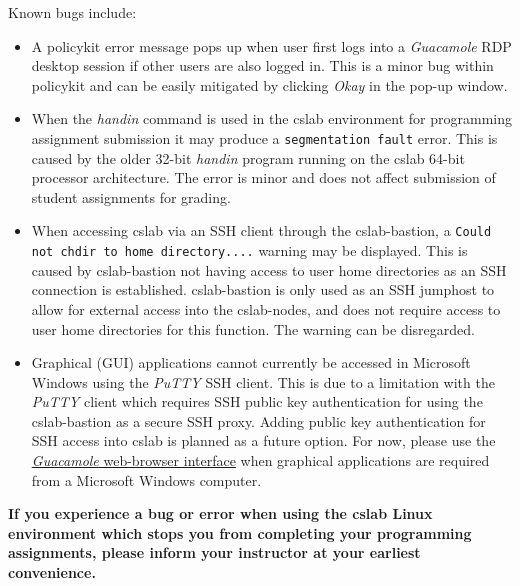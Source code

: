 \documentclass[12pt]{article}
\begin{document}
Known bugs include:
\begin{itemize}
  \item A policykit error message pops up when user first logs into a \textit{Guacamole} RDP desktop session if other users are also logged in. This is a minor bug within policykit and can be easily mitigated by clicking \textit{Okay} in the pop-up window.
  \item When the \textit{handin} command is used in the cslab environment for programming assignment submission it may produce a \texttt{segmentation fault} error. This is caused by the older 32-bit \textit{handin} program running on the cslab 64-bit processor architecture. The error is minor and does not affect submission of student assignments for grading.
  \item When accessing cslab via an SSH client through the cslab-bastion, a \texttt{Could not chdir to home directory....} warning may be displayed. This is caused by cslab-bastion not having access to user home directories as an SSH connection is established. cslab-bastion is only used as an SSH jumphost to allow for external access into the cslab-nodes, and does not require access to user home directories for this function. The warning can be disregarded.
  \item Graphical (GUI) applications cannot currently be accessed in Microsoft Windows using the \textit{PuTTY} SSH client. This is due to a limitation with the \textit{PuTTY} client which requires SSH public key authentication for using the cslab-bastion as a secure SSH proxy. Adding public key authentication for SSH access into cslab is planned as a future option. For now, please use the \hyperref[guac_login]{\textit{Guacamole} web-browser interface} when graphical applications are required from a Microsoft Windows computer.
\end{itemize}

\textbf{If you experience a bug or error when using the cslab Linux environment which stops you from completing your programming assignments, please inform your instructor at your earliest convenience.}


\end{document}
